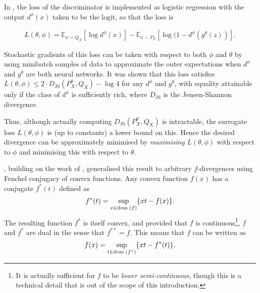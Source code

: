 In \cite{goodfellow}, the loss of the discriminator is implemented as logistic regression with the output $d^\phi(x)$ taken to be the logit, so that the loss is

\begin{align*}
L(\theta, \phi) = \mathbb{E}_{x\sim Q_X}\left[ \log d^\phi(x) \right] - \mathbb{E}_{x \sim P_Z} \left[\log(1 - d^\phi(g^\theta(z)) \right].
\end{align*}

Stochastic gradients of this loss can be taken with respect to both $\phi$ and $\theta$ by using minibatch samples of data to approximate the outer expectations when $d^\phi$ and $g^\theta$ are both neural networks.
It was shown that this loss satisfies $L(\theta, \phi) \leq 2 \cdot D_{\text{JS}}(P^\theta_X, Q_X) - \log 4$ for any $d^\phi$ and $g^\theta$, with equality attainable only if the class of $d^\phi$ is sufficiently rich, where $D_{\text{JS}}$ is the Jensen-Shannon divergence. 

Thus, although actually computing $D_{\text{JS}}(P^\theta_X, Q_X)$ is intractable, the surrogate loss $L(\theta, \phi)$ is (up to constants) a lower bound on this.
Hence the desired divergence can be approximately minimised by \emph{maximising} $L(\theta, \phi)$ with respect to $\phi$ and minimising this with respect to $\theta$.

\cite{f-gan}, building on the work of \cite{nguyen}, generalised this result to arbitrary $f$-divergences using Fenchel conjugacy of convex functions.
Any convex function $f(x)$ has a conjugate $f^*(t)$ defined as
%
\begin{align*}
f^*(t) = \sup_{x \in {\bf{\rm dom}}\;(f)} \{xt - f(x)\}.
\end{align*}
%
The resulting function $f^*$ is itself convex, and
provided that $f$ is continuous\footnote{It is actually sufficient for $f$ to be \emph{lower semi-continuous}, though this is a technical detail that is out of the scope of this introduction.}, $f$ and $f^*$ are dual in the sense that $f^{**} = f$.
This means that $f$ can be written as
%
\begin{align*}
f(x) = \sup_{t \in {\bf{\rm dom}}\;(f^*)} \{xt - f^*(t)\}.
\end{align*}

